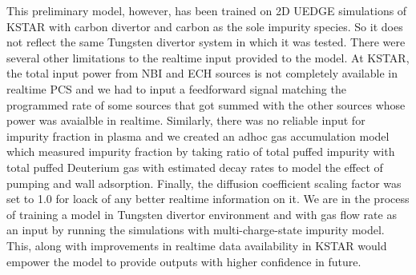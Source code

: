 This preliminary model, however, has been trained on 2D UEDGE simulations of KSTAR with carbon divertor and carbon as the sole impurity species.
So it does not reflect the same Tungsten divertor system in which it was tested.
There were several other limitations to the realtime input provided to the model.
At KSTAR, the total input power from NBI and ECH sources is not completely available in realtime PCS and we had to input a feedforward signal matching the programmed rate of some sources that got summed with the other sources whose power was avaialble in realtime.
Similarly, there was no reliable input for impurity fraction in plasma and we created an adhoc gas accumulation model which measured impurity fraction by taking ratio of total puffed impurity with total puffed Deuterium gas with estimated decay rates to model the effect of pumping and wall adsorption.
Finally, the diffusion coefficient scaling factor was set to 1.0 for loack of any better realtime information on it.
We are in the process of training a model in Tungsten divertor environment and with gas flow rate as an input by running the simulations with multi-charge-state impurity model.
This, along with improvements in realtime data availability in KSTAR would empower the model to provide outputs with higher confidence in future.
